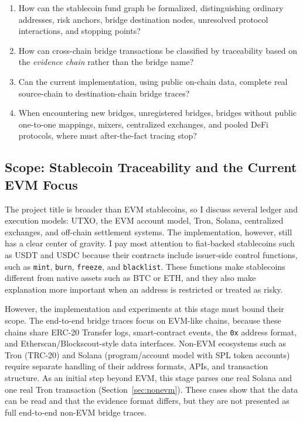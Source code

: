 \documentclass[12pt,a4paper]{article}
\begin{document}
\begin{enumerate}
    \item How can the stablecoin fund graph be formalized, distinguishing ordinary addresses, risk anchors, bridge destination nodes, unresolved protocol interactions, and stopping points?
    \item How can cross-chain bridge transactions be classified by traceability based on the \textit{evidence chain} rather than the bridge name?
    \item Can the current implementation, using public on-chain data, complete real source-chain to destination-chain bridge traces?
    \item When encountering new bridges, unregistered bridges, bridges without public one-to-one mappings, mixers, centralized exchanges, and pooled DeFi protocols, where must after-the-fact tracing stop?
\end{enumerate}

\subsection{Scope: Stablecoin Traceability and the Current EVM Focus}

The project title is broader than EVM stablecoins, so I discuss several ledger and execution models: UTXO, the EVM account model, Tron, Solana, centralized exchanges, and off-chain settlement systems. The implementation, however, still has a clear center of gravity. I pay most attention to fiat-backed stablecoins such as USDT and USDC because their contracts include issuer-side control functions, such as \texttt{mint}, \texttt{burn}, \texttt{freeze}, and \texttt{blacklist}. These functions make stablecoins different from native assets such as BTC or ETH, and they also make explanation more important when an address is restricted or treated as risky.

However, the implementation and experiments at this stage must bound their scope. The end-to-end bridge traces focus on EVM-like chains, because these chains share ERC-20 Transfer logs, smart-contract events, the \texttt{0x} address format, and Etherscan/Blockscout-style data interfaces. Non-EVM ecosystems such as Tron (TRC-20) and Solana (program/account model with SPL token accounts) require separate handling of their address formats, APIs, and transaction structure. As an initial step beyond EVM, this stage parses one real Solana and one real Tron transaction (Section~\ref{sec:nonevm}). These cases show that the data can be read and that the evidence format differs, but they are not presented as full end-to-end non-EVM bridge traces.
\end{document}
